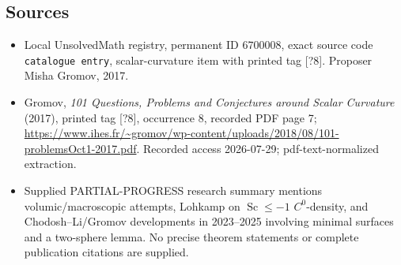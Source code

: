 \documentclass[11pt]{article}
\begin{document}
\subsection{Sources}
\begin{itemize}
\item Local UnsolvedMath registry, permanent ID \(6700008\), exact source code \texttt{catalogue entry}, scalar-curvature item with printed tag [?8]. Proposer Misha Gromov, 2017.
\item Gromov, \emph{101 Questions, Problems and Conjectures around Scalar Curvature} (2017), printed tag [?8], occurrence 8, recorded PDF page 7; \url{https://www.ihes.fr/~gromov/wp-content/uploads/2018/08/101-problemsOct1-2017.pdf}. Recorded access 2026-07-29; pdf-text-normalized extraction.
\item Supplied PARTIAL-PROGRESS research summary mentions volumic/macroscopic attempts, Lohkamp on \(\operatorname{Sc}\le-1\) \(C^0\)-density, and Chodosh--Li/Gromov developments in 2023--2025 involving minimal surfaces and a two-sphere lemma. No precise theorem statements or complete publication citations are supplied.
\end{itemize}
\end{document}
